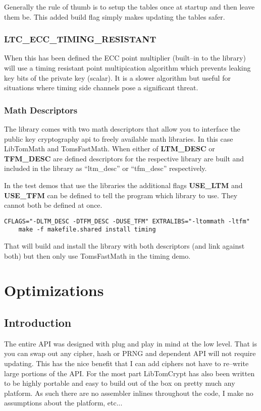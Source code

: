 \documentclass[a4paper]{book}
\begin{document}
Generally the rule of thumb is to setup the tables once at startup and then leave them be.  This added build flag simply makes updating
the tables safer.

\subsection{LTC\_ECC\_TIMING\_RESISTANT}
When this has been defined the ECC point multiplier (built--in to the library) will use a timing resistant point multipication
algorithm which prevents leaking key bits of the private key (scalar).  It is a slower algorithm but useful for situations
where timing side channels pose a significant threat.

\subsection{Math Descriptors}
The library comes with two math descriptors that allow you to interface the public key cryptography api to freely available math
libraries.  In this case LibTomMath and TomsFastMath.  When either of \textbf{LTM\_DESC} or \textbf{TFM\_DESC} are defined
descriptors for the respective library are built and included in the library as ``ltm\_desc'' or ``tfm\_desc'' respectively.

In the test demos that use the libraries the additional flags \textbf{USE\_LTM} and \textbf{USE\_TFM} can be defined
to tell the program which library to use.  They cannot both be defined at once.

   
\begin{small}
\begin{verbatim}
CFLAGS="-DLTM_DESC -DTFM_DESC -DUSE_TFM" EXTRALIBS="-ltommath -ltfm" 
    make -f makefile.shared install timing
\end{verbatim}
\end{small}

That will build and install the library with both descriptors (and link against both) but then only use TomsFastMath in the timing demo.  

\chapter{Optimizations}
\section{Introduction}
The entire API was designed with plug and play in mind at the low level.  That is you can swap out any cipher, hash or PRNG and dependent API will not require
updating.  This has the nice benefit that I can add ciphers not have to re--write large portions of the API.  For the most part LibTomCrypt has also been written
to be highly portable and easy to build out of the box on pretty much any platform.  As such there are no assembler inlines throughout the code, I make no assumptions
about the platform, etc...
\end{document}
